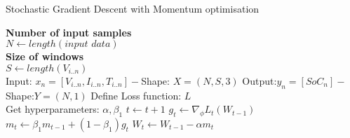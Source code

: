 \begin{algorithm}
  \caption{Stochastic Gradient Descent with Momentum optimisation}
  \begin{algorithmic}[1]
    \STATE \textbf{Number of input samples} \\ $N\gets length(\textit{input data})$\\
    \STATE \textbf{Size of windows} \\ $S\gets length(V_{i..n})$\\
    \STATE Input: $x_n = [V_{i..n}, I_{i..n}, T_{i..n}] - $Shape: $X = (N, S, 3)$
    \STATE Output:$y_n = [SoC_{n}] - $Shape:$Y = (N, 1)$
    \STATE Define Loss function: $L$ \\
           Get hyperparameters: $\alpha, \beta_1$
    \STATE $t \gets t+1$
    \STATE $g_t \gets \nabla_\phi L_t (W_{t-1})$ 
    \STATE $m_t \gets \beta_1 m_{t-1}+(1-\beta_1) g_t $ 
    \STATE $W_t \gets W_{t-1} - \alpha m_t $  
    \ENDWHILE
  \end{algorithmic}
  \label{alg:SGDwM}
\end{algorithm}

%
